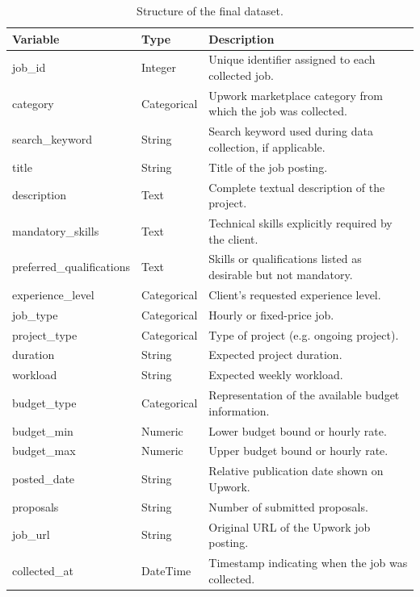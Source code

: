 \begin{table}[H]
\centering
\caption{Structure of the final dataset.}
\label{tab:dataset_structure}

\begin{tabularx}{\textwidth}{l l X}
\toprule
\textbf{Variable} & \textbf{Type} & \textbf{Description} \\
\midrule
job\_id & Integer & Unique identifier assigned to each collected job. \\

category & Categorical & Upwork marketplace category from which the job was collected. \\

search\_keyword & String & Search keyword used during data collection, if applicable. \\

title & String & Title of the job posting. \\

description & Text & Complete textual description of the project. \\

mandatory\_skills & Text & Technical skills explicitly required by the client. \\

preferred\_qualifications & Text & Skills or qualifications listed as desirable but not mandatory. \\

experience\_level & Categorical & Client's requested experience level. \\

job\_type & Categorical & Hourly or fixed-price job. \\

project\_type & Categorical & Type of project (e.g. ongoing project). \\

duration & String & Expected project duration. \\

workload & String & Expected weekly workload. \\

budget\_type & Categorical & Representation of the available budget information. \\

budget\_min & Numeric & Lower budget bound or hourly rate. \\

budget\_max & Numeric & Upper budget bound or hourly rate. \\

posted\_date & String & Relative publication date shown on Upwork. \\

proposals & String & Number of submitted proposals. \\

job\_url & String & Original URL of the Upwork job posting. \\

collected\_at & DateTime & Timestamp indicating when the job was collected. \\
\bottomrule
\end{tabularx}
\end{table}

